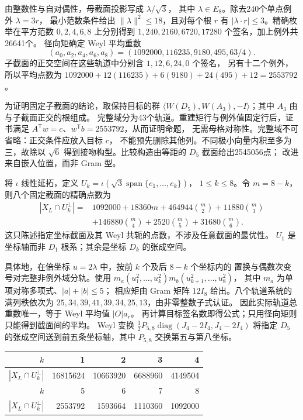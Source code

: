 由整数性与自对偶性，母截面投影写成 $\lambda/\sqrt3$，
其中 $\lambda\in E_8$。除去240个单点例外 $\lambda=3r$，
最小范数条件给出 $\|\lambda\|^2\le18$，且对每个根 $r$ 有
$|\lambda\cdot r|\le3$。精确枚举在平方范数 $0,2,4,6,8$ 上分别得到
$1,240,2160,6720,17280$ 个签名，加上例外共26641个。
径向矩确定 Weyl 平均重数
\[
(a_0,a_2,a_4,a_6,a_8)=(1092000,116235,9180,495,63/4).
\]
子截面的正交空间在这些轨道中分别含 $1,12,6,24,0$ 个签名，
另有十二个例外，所以平均点数为
$1092000+12(116235)+6(9180)+24(495)+12=2553792$。

为证明固定子截面的结论，取保持目标的群
$\langle W(D_5),W(A_3),-I\rangle$；其中 $A_3$ 由与子截面正交的根组成。
完整域分为43个轨道。重建矩行与例外值固定行后，证书满足
$A^{\mathsf T}w=c$、$w^{\mathsf T}b=2553792$，从而证明命题，
无需母格对称性。完整域不可省略：正交条件应放入目标 $c$，
不能预先删除其他列。不同极小向量内积至多为三，故除以 $\sqrt6$
得到接吻构型。比较构造由等距的 $D_5$ 截面给出2545056点；
改进来自嵌入位置，而非 Gram 型。

将 $\iota$ 线性延拓，定义
$U_k=\iota(\sqrt3\operatorname{span}\{e_1,\ldots,e_k\})$，
$1\le k\le8$。令 $m=8-k$，则八个固定截面的精确点数为
\begin{align*}
|X_L\cap U_k^\perp|={}&1092000+18360m+464944\binom m2
+11880\binom m3\\
&+146880\binom m4+2520\binom m5+31680\binom m6.
\end{align*}
这只陈述指定坐标截面及其 Weyl 共轭的点数，不涉及任意截面的最优性。
$U_1$ 是坐标轴而非 $D_1$ 根系；其余是坐标 $D_k$ 的张成空间。

具体地，在倍坐标 $u=2\lambda$ 中，按前 $k$ 个及后 $8-k$ 个坐标内的
置换与偶数次变号对完整非例外域分轨。使用
$m_a(u_1^2,\ldots,u_k^2)m_b(u_{k+1}^2,\ldots,u_8^2)$，
其中 $m_a$ 为单项对称多项式、$|a|+|b|\le5$；
相应矩由 Gram 矩阵 $12I_8$ 给出。八个轨道系统的满列秩依次为
$25,34,39,41,39,34,25,13$，由非零整数子式认证。
因此实际轨道总重数唯一，等于 Weyl 平均值 $|O|a_r$。
再计算目标签名数即得公式；只用径向矩则只能得到截面间的平均。
Weyl 变换
$\tfrac12P_{5,8}\operatorname{diag}(J_4-2I_4,J_4-2I_4)$
将指定 $D_5$ 的张成空间送到前五条坐标轴，其中 $P_{5,8}$ 交换第五与第八坐标。

\begin{center}
\begin{tabular}{r|rrrr}
$k$&1&2&3&4\\\hline
$|X_L\cap U_k^\perp|$&16815624&10663920&6688960&4149504\\[2pt]
$k$&5&6&7&8\\\hline
$|X_L\cap U_k^\perp|$&2553792&1593664&1110360&1092000
\end{tabular}
\end{center}

